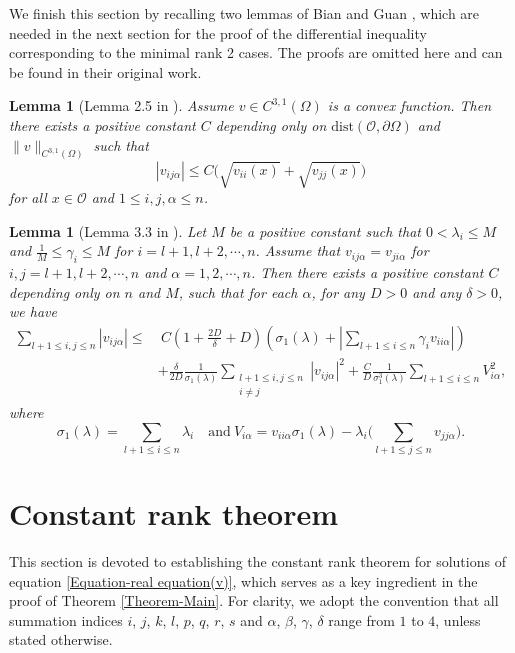 \documentclass[11pt]{amsart}
\newtheorem{lemma}[theorem]{Lemma}
\numberwithin{theorem}{section}
\numberwithin{equation}{section}
\begin{document}
We finish this section by recalling two lemmas of Bian and Guan \cite{Bian-Guan2009}, which are needed in the next section for the proof of the differential inequality corresponding to the minimal rank 2 cases. The proofs are omitted here and can be found in their original work.
\begin{lemma}[Lemma 2.5 in \cite{Bian-Guan2009}]\label{Lemma-v_{ijalpha}}
Assume $v\in C^{3,1}(\Omega)$ is a convex function. Then there exists a positive constant $C$ depending only on $\mathrm{dist}(\mathcal{O},\partial\Omega)$ and $\|v\|_{C^{3,1}(\Omega)}$ such that
\begin{equation}
|v_{ij\alpha}|\leq C\bigg(\sqrt{v_{ii}(x)}+\sqrt{v_{jj}(x)}\bigg)
\end{equation}
for all $x\in\mathcal{O}$ and $1\leq i,j,\alpha\leq n$.
\end{lemma}
\begin{lemma}[Lemma 3.3 in \cite{Bian-Guan2009}]\label{Lemma-v_{ijk}}
Let $M$ be a positive constant such that $0<\lambda_i\leq M$ and $\frac{1}{M}\leq\gamma_i\leq M$ for $i=l+1, l+2, \cdots, n$. Assume that $v_{ij\alpha}=v_{ji\alpha}$ for $i, j=l+1, l+2, \cdots, n$ and $\alpha=1, 2, \cdots, n$. Then there exists a positive constant $C$ depending only on $n$ and $M$, such that for each $\alpha$, for any $D>0$ and any $\delta>0$, we have
\begin{align*}
\sum_{l+1\leq i, j\leq n}|v_{ij\alpha}|
\leq&~C\left(1+\frac{2D}{\delta}+D\right)\left(\sigma_1(\lambda) +\left|\sum_{l+1\leq i\leq n}\gamma_iv_{ii\alpha}\right|\right)\\
&+\frac{\delta}{2D}\frac{1}{\sigma_1(\lambda)}\sum_{\substack{l+1\leq i, j\leq n\\ i\neq j}}|v_{ij\alpha}|^2+\frac{C}{D}\frac{1}{\sigma_1^3(\lambda)}
\sum_{l+1\leq i\leq n}V_{i\alpha}^2,
\end{align*}
where $$\sigma_1(\lambda)=\sum_{l+1\leq i\leq n}\lambda_i \quad \mathrm{and} \ V_{i\alpha}=v_{ii\alpha}\sigma_1(\lambda)-\lambda_i\bigg(\sum_{l+1\leq j\leq n}v_{jj\alpha}\bigg). $$
\end{lemma}

\section{Constant rank theorem}\label{Section 3}

This section is devoted to establishing the constant rank theorem for solutions of equation \eqref{Equation-real equation(v)}, which serves as a key ingredient in the proof of Theorem \ref{Theorem-Main}. For clarity, we adopt the convention that all summation indices $i$, $j$, $k$, $l$, $p$, $q$, $r$, $s$ and $\alpha$, $\beta$, $\gamma$, $\delta$ range from $1$ to $4$, unless stated otherwise.
\end{document}
